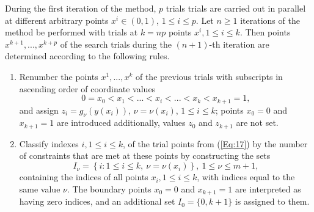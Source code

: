 \documentclass[
11pt,%
tightenlines,%
twoside,%
onecolumn,%
nofloats,%
nobibnotes,%
nofootinbib,%
superscriptaddress,%
noshowpacs,%
centertags]%
{revtex4}
\begin{document}
During the first iteration of the method, $p$ trials trials are carried out in parallel at different arbitrary points $x^i\in(0,1)$, $1\leq i \leq p$.
Let $n\geq 1$ iterations of the method be performed with trials at $k=np$ points $x^i, 1\leq i \leq k$. Then points $x^{k+1},...,x^{k+p}$ of the search trials during the $(n+1)$-th iteration are determined according to the following rules.

\begin{enumerate}
\item 
Renumber the points $x^1,...,x^k$ of the previous trials with subscripts in ascending order of coordinate values
\begin{equation}\label{Eq:17}
0=x_0<x_1<...<x_i<...<x_k<x_{k+1}=1,
\end{equation}
and assign $z_i=g_\nu(y(x_i))$, $\nu=\nu(x_i)$, $1 \leq i \leq k$; points $x_0=0$ and $x_{k+1}=1$ are introduced additionally, values $z_0$ and $z_{k+1}$ are not set.
\item
Classify indexes  $i,1\leq i \leq k$, of the trial points from  (\ref{Eq:17}) by the number of constraints that are met at these points by constructing the sets
\begin{equation}\label{Eq:18}
I_\nu = \left\{i: 1 \leq i \leq k,\ \nu = \nu(x_i)\right\},\ 1 \leq \nu \leq m+1,
\end{equation}
containing the indices of all points $x_i,1\leq i \leq k$, with indices equal to the same value $\nu$. The boundary points $x_0=0$ and $x_{k+1}=1$ are interpreted as having zero indices, and an additional set $I_0=\{0,k+1\}$ is assigned to them. 


\end{enumerate}
\end{document}
